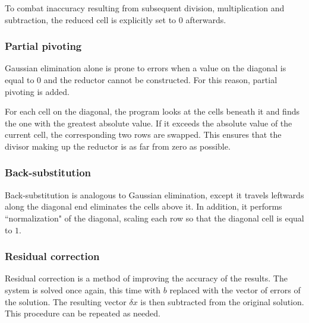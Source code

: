 \documentclass{article}
\begin{document}
	To combat inaccuracy resulting from subsequent division, multiplication and
	subtraction, the reduced cell is explicitly set to $0$ afterwards.
	
	\subsubsection{Partial pivoting}
	
	Gaussian elimination alone is prone to errors when a value on the diagonal
	is equal to $0$ and the reductor cannot be constructed. For this reason,
	partial pivoting is added.
	
	For each cell on the diagonal, the program looks at the cells beneath it and
	finds the one with the greatest absolute value. If it exceeds the absolute
	value of the current cell, the corresponding two rows are swapped. This
	ensures that the divisor making up the reductor is as far from zero as
	possible.
	
	\subsubsection{Back-substitution}
	
	Back-substitution is analogous to Gaussian elimination, except it travels
	leftwards along the diagonal end eliminates the cells above it. In addition,
	it performs ``normalization" of the diagonal, scaling each row so that the
	diagonal cell is equal to $1$.
	
	\subsubsection{Residual correction}
	
	Residual correction is a method of improving the accuracy of the results.
	The system is solved once again, this time with $b$ replaced with the vector
	of errors of the solution. The resulting vector $\delta x$ is then
	subtracted from the original solution. This procedure can be repeated as
	needed.
	
\end{document}
